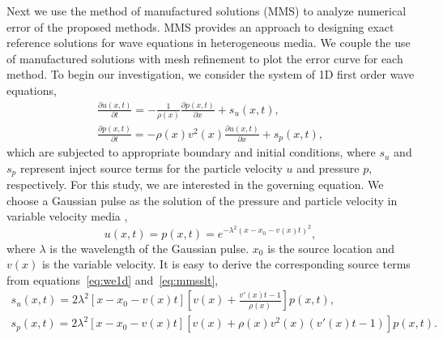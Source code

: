Next we use the method of manufactured solutions (MMS) \cite[]{mms} to analyze numerical error of the proposed methods. MMS provides an approach to designing exact reference solutions for wave equations in heterogeneous media. We couple the use of manufactured solutions with mesh refinement to plot the error curve for each method. To begin our investigation, we consider the system of 1D first order wave equations,
\begin{equation}
\begin{array}{l}
\label{eq:we1d}
\displaystyle \frac{\partial u(x,t)}{\partial t} = -\frac{1}{\rho(x)}\frac{\partial p(x,t)}{\partial x}+s_u(x,t), \\
\displaystyle \frac{\partial p(x,t)}{\partial t} = -\rho(x)v^2(x)\frac{\partial u(x,t)}{\partial x}+s_p(x,t),
\end{array}
\end{equation}
which are subjected to appropriate boundary and initial conditions, where $s_u$ and $s_p$ represent inject source terms for the particle velocity $u$ and pressure $p$, respectively. For this study, we are interested in the governing equation. We choose a Gaussian pulse as the solution of the pressure and particle velocity in variable velocity media \cite[]{mmsawe},
\begin{equation}
\label{eq:mmsslt}
\displaystyle u(x,t) = p(x,t) = e^{-\lambda^2(x-x_0-v(x)t)^2},
\end{equation}
where $\lambda$ is the wavelength of the Gaussian pulse. $x_0$ is the source location and $v(x)$ is the variable velocity. It is easy to derive the corresponding source terms from equations~\ref{eq:we1d} and~\ref{eq:mmsslt},
\begin{equation}
\begin{array}{l}
\label{eq:mmssrc}
\displaystyle s_u(x,t) = 2\lambda^2[x-x_0-v(x)t][v(x)+\frac{v'(x)t-1}{\rho(x)}]p(x,t), \\
\displaystyle s_p(x,t) = 2\lambda^2[x-x_0-v(x)t][v(x)+\rho(x)v^2(x)(v'(x)t-1)]p(x,t).
\end{array}
\end{equation}

